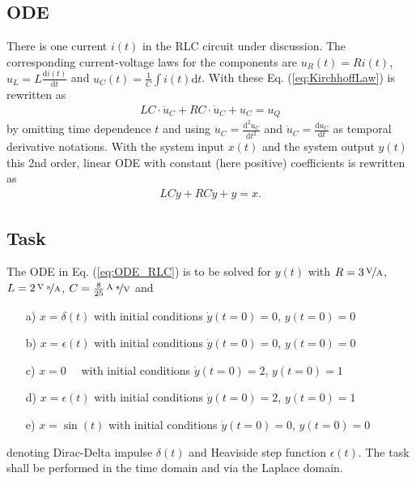 \documentclass[a4paper,11pt,oneside]{scrartcl}
\newcommand{\eq}[1]{Eq. (\ref{#1})}
\begin{document}
\subsection{ODE}
There is one current $i(t)$ in the RLC circuit under discussion.
The corresponding current-voltage laws for the components are
$u_R(t) = R i(t)$,
$u_L = L\frac{\mathrm{d}i(t)}{\mathrm{d} t}$ and
$u_C(t) = \frac{1}{C}\int i(t) \mathrm{d}t$.
With these \eq{eq:KirchhoffLaw} is rewritten as
%
\begin{align}
L C \cdot \ddot{u}_C + R C \cdot \dot{u}_C + u_C = u_Q
\end{align}
by omitting time dependence $t$ and using
$\ddot{u}_C = \frac{\mathrm{d}^2 u_C}{\mathrm{d}t^2}$ and
$\dot{u}_C = \frac{\mathrm{d} u_C}{\mathrm{d}t}$
as temporal derivative notations.
%
With
the system input $x(t)$ and
the system output $y(t)$ this 2nd order, linear ODE with
constant (here positive) coefficients is rewritten as
\begin{align}
\label{eq:ODE_RLC}
L C \ddot{y} + R C \dot{y} + y = x.
\end{align}

\subsection{Task}
The ODE in \eq{eq:ODE_RLC} is to be solved for $y(t)$ with
$R = 3\,\nicefrac{\text{V}}{\text{A}}$,
$L=2\,\nicefrac{\text{V s}}{\text{A}}$,
$C=\frac{8}{25}\,\nicefrac{\text{A s}}{\text{V}}$
and
\begin{itemize}
\item[a)] $x=\delta(t)$ with initial conditions $\dot{y}(t=0) = 0$, $y(t=0)=0$
\item[b)] $x=\epsilon(t)$ with initial conditions $\dot{y}(t=0) = 0$, $y(t=0)=0$
\item[c)] $x=0\quad$ with initial conditions $\dot{y}(t=0) = 2$, $y(t=0)=1$
\item[d)] $x=\epsilon(t)$ with initial conditions $\dot{y}(t=0) = 2$, $y(t=0)=1$
\item[e)] $x=\sin(t)$ with initial conditions $\dot{y}(t=0) = 0$, $y(t=0)=0$
\end{itemize}
denoting Dirac-Delta impulse $\delta(t)$ and Heaviside step function $\epsilon(t)$.
%
The task shall be performed in the time domain and via the Laplace domain.

\end{document}

